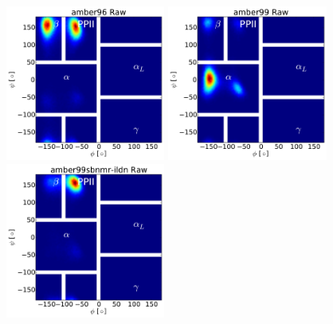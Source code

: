 \documentclass[journal=jacsat,manuscript=article]{achemso}
\begin{document}
\begin{figure}

\includegraphics[width=5.25cm]{figures/ALA3_rama_amber96_raw.pdf}
\includegraphics[width=5.25cm]{figures/ALA3_rama_amber99_raw.pdf}
\includegraphics[width=5.25cm]{figures/ALA3_rama_amber99sbnmr-ildn_raw.pdf}


\end{figure}
\end{document}
